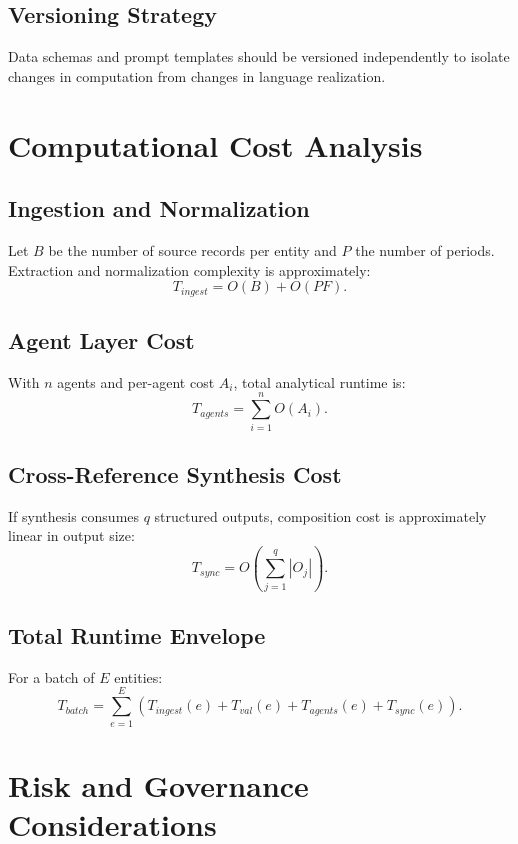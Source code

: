 \documentclass[conference]{IEEEtran}
\begin{document}
\subsection{Versioning Strategy}
Data schemas and prompt templates should be versioned independently to isolate changes in computation from changes in language realization.

\section{Computational Cost Analysis}
\subsection{Ingestion and Normalization}
Let $B$ be the number of source records per entity and $P$ the number of periods. Extraction and normalization complexity is approximately:
\begin{equation}
T_{ingest}=O(B)+O(PF).
\end{equation}

\subsection{Agent Layer Cost}
With $n$ agents and per-agent cost $A_i$, total analytical runtime is:
\begin{equation}
T_{agents}=\sum_{i=1}^{n}O(A_i).
\end{equation}

\subsection{Cross-Reference Synthesis Cost}
If synthesis consumes $q$ structured outputs, composition cost is approximately linear in output size:
\begin{equation}
T_{sync}=O\left(\sum_{j=1}^{q}|O_j|\right).
\end{equation}

\subsection{Total Runtime Envelope}
For a batch of $E$ entities:
\begin{equation}
T_{batch}=\sum_{e=1}^{E}\left(T_{ingest}(e)+T_{val}(e)+T_{agents}(e)+T_{sync}(e)\right).
\end{equation}

\section{Risk and Governance Considerations}
\end{document}
